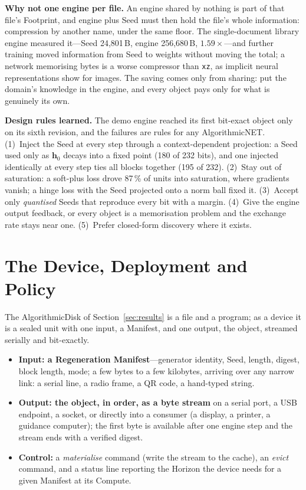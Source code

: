 \documentclass[11pt,a4paper]{article}
\theoremstyle{definition}
\theoremstyle{plain}
\theoremstyle{remark}
\newcommand{\anet}{AlgorithmicNET}
\newcommand{\adisk}{AlgorithmicDisk}
\begin{document}
\textbf{Why not one engine per file.} An engine shared by nothing is part of that file's
Footprint, and engine plus Seed must then hold the file's whole information: compression by
another name, under the same floor. The single-document library engine measured it---Seed
24,801\,B, engine 256,680\,B, $1.59\times$---and further training moved information from Seed to
weights without moving the total; a network memorising bytes is a worse compressor than
\texttt{xz}, as implicit neural representations show for images. The saving comes only from
sharing: put the domain's knowledge in the engine, and every object pays only for what is
genuinely its own.

\textbf{Design rules learned.} The demo engine reached its first bit-exact object only on its
sixth revision, and the failures are rules for any \anet{}. (1)~Inject the Seed at every step
through a context-dependent projection: a Seed used only as $\mathbf{h}_0$ decays into a fixed
point (180 of 232 bits), and one injected identically at every step ties all blocks together (195
of 232). (2)~Stay out of saturation: a soft-plus loss drove 87\,\% of units into saturation,
where gradients vanish; a hinge loss with the Seed projected onto a norm ball fixed it.
(3)~Accept only \emph{quantised} Seeds that reproduce every bit with a margin. (4)~Give the
engine output feedback, or every object is a memorisation problem and the exchange rate stays
near one. (5)~Prefer closed-form discovery where it exists.

\section{The Device, Deployment and Policy}
\label{sec:device}
The \adisk{} of Section~\ref{sec:results} is a file and a program; as a device it is a sealed
unit with one input, a Manifest, and one output, the object, streamed serially and bit-exactly.
\begin{itemize}[leftmargin=1.4em,itemsep=1pt]
  \item \textbf{Input: a Regeneration Manifest}---generator identity, Seed, length, digest, block
        length, mode; a few bytes to a few kilobytes, arriving over any narrow link: a serial line,
        a radio frame, a QR code, a hand-typed string.
  \item \textbf{Output: the object, in order, as a byte stream} on a serial port, a USB endpoint,
        a socket, or directly into a consumer (a display, a printer, a guidance computer); the
        first byte is available after one engine step and the stream ends with a verified digest.
  \item \textbf{Control:} a \emph{materialise} command (write the stream to the cache), an
        \emph{evict} command, and a status line reporting the Horizon the device needs for a
        given Manifest at its Compute.
\end{itemize}
\end{document}
